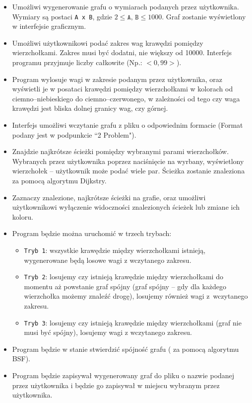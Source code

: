 \documentclass[12pt, a4paper]{article}
\begin{document}
\begin{itemize}
\item Umożliwi wygenerowanie grafu o wymiarach podanych przez użytkownika. Wymiary są postaci \texttt{A x B}, gdzie $2 \leq \texttt{A, B} \leq 1000$. Graf zostanie wyświetlony w interfejsie graficznym.
\item Umożliwi użytkownikowi podać zakres wag krawędzi pomiędzy wierzchołkami. Zakres musi być dodatni, nie większy od 10000. Interfejs programu przyjmuje liczby całkowite (Np.: $<0, 99>$). 
\item Program wylosuje wagi w zakresie podanym przez użytkownika, oraz wyświetli je w posataci krawędzi pomiędzy wierzchołkami w kolorach od ciemno--niebieskiego do ciemno--czerwonego, w zależności od tego czy waga krawędzi jest bliska dolnej granicy wag, czy górnej.
\item Interfejs umożliwi wczytanie grafu z pliku o odpowiednim formacie (Format podany jest w podpunkcie ``2 Problem").
\item Znajdzie najkrótsze ścieżki pomiędzy wybranymi parami wierzchołków. Wybranych przez użytkownika poprzez naciśnięcie na wyrbany, wyświetlony wierzchołek -- użytkownik może podać wiele par. Ścieżka zostanie znaleziona za pomocą algorytmu Dijkstry.
\item Zaznaczy znalezione, najkrótsze ścieżki na grafie, oraz umożliwi użytkownikowi wyłączenie widoczności znalezionych ścieżek lub zmiane ich koloru.
\item Program będzie można uruchomić w trzech trybach:
\begin{itemize}
    \item \texttt{Tryb 1}: wszystkie krawędzie między wierzchołkami istnieją, 		wygenerowane będą losowe wagi z wczytanego zakresu.
	\item \texttt{Tryb 2}: losujemy czy istnieją krawędzie między wierzchołkami do momentu aż powstanie graf spójny (graf spójny – gdy dla każdego wierzchołka możemy znaleźć drogę), losujemy również wagi z~wczytanego zakresu.
	\item \texttt{Tryb 3}: losujemy czy istnieją krawędzie między wierzchołkami (graf nie musi być spójny), losujemy wagi z wczytanego zakresu.
\end{itemize}

\item Program będzie w stanie stwierdzić spójność grafu ( za pomocą algorytmu BSF).

\item Program będzie zapisywał wygenerowany graf do pliku o nazwie podanej przez użytkownika i będzie go zapisywał w miejscu wybranym przez użytkownika.




\end{itemize}
\end{document}
